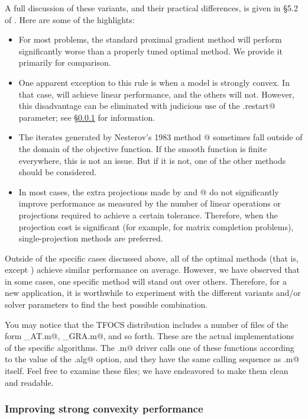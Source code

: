 \documentclass{article}
\newcommand{\<}{\langle}
\renewcommand{\>}{\rangle}
\begin{document}
A full discussion of these variants, and their practical differences, is
given in \S5.2 of \cite{TFOCS}. Here are some of the highlights:
\begin{itemize}
\item For most problems, the standard proximal gradient method 
\verb@GRA@ will perform significantly worse than a properly
tuned optimal method. We provide it primarily for comparison.
\item One apparent exception to this rule is when a model is
strongly convex. In that case, \verb@GRA@ will achieve
linear performance, and the others will not. However, this disadvantage
can be eliminated with judicious use of the \verb@opts.restart@
parameter; see \S\ref{sec:restart} for information.
\item The iterates generated by Nesterov's 1983 method @ sometimes
fall outside of the domain of the objective function. If the smooth function is
finite everywhere, this is not an issue. But if it is not, one of the other
methods should be considered.
\item In most cases, the extra projections made by
\verb@LLM@ and @
do not significantly improve performance as measured by the number of linear
operations or projections required to achieve a certain tolerance. Therefore,
when the projection cost is significant (for example, for matrix completion
problems), single-projection methods are preferred.
\end{itemize}
Outside of the specific cases discussed above, all of the optimal
methods (that is, except \verb@GRA@)
achieve similar performance on average.
However, we have observed that in some cases, one specific
method will stand out over others.
Therefore, for a new application, it is worthwhile to experiment with
the different variants and/or solver parameters to find the best
possible combination.

You may notice that the TFOCS distribution includes a number of
files of the form \verb@tfocs_AT.m@, \verb@tfocs_GRA.m@, and so forth.
These are the actual implementations of the specific algorithms.
The \verb@tfocs.m@ driver calls one of these functions
according to the value of the \verb@opts.alg@ option, and they have
the same calling sequence as \verb@tfocs.m@ itself. Feel free to
examine these files; we have endeavored to make them clean and readable.

\subsubsection{Improving strong convexity performance}
\label{sec:restart}
\end{document}
